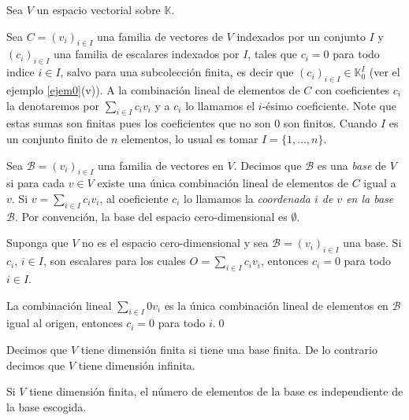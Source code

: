 Sea $V$ un espacio vectorial sobre $\mathbb{K}$. 

\begin{nota}
Sea $C=(v_i)_{i\in I}$ una familia de vectores de $V$ indexados por un conjunto $I$ y $(c_i)_{i\in I}$ una familia de escalares indexados por $I$, tales que $c_i=0$ para todo indice $i\in I$, salvo para una subcolecci\'on finita, es decir que $(c_i)_{i\in I}\in \mathbb{K}^I_0$ (ver el ejemplo \ref{ejem0}(v)). A la combinación lineal de elementos de $C$ con coeficientes $c_i$ la denotaremos por $\sum_{i\in I} c_iv_i$ y a $c_i$ lo llamamos el $i$-ésimo coeficiente. Note que estas sumas son finitas pues los coeficientes que no son $0$ son finitos. Cuando $I$ es un conjunto finito de $n$ elementos, lo usual es tomar $I=\{1,\ldots,n\}$.
\end{nota}

\begin{defn}
Sea $\mathcal{B}=(v_i)_{i\in I}$ una familia de vectores en $V$. Decimos que $\mathcal{B}$ es una \emph{base} de $V$ si para cada $v\in V$ existe una \'unica combinaci\'on lineal de elementos de $C$ igual a $v$. Si $v=\sum_{i\in I} c_iv_i$, al coeficiente $c_i$ lo llamamos la \emph{coordenada $i$ de $v$ en la base $\mathcal{B}$}. Por convenci\'on, la base del espacio cero-dimensional es $\emptyset$. 
\end{defn}

\begin{lema}\label{lemabas}
Suponga que $V$ no es el espacio cero-dimensional y sea $\mathcal{B}=(v_i)_{i\in I}$ una base. Si $c_i$, $i\in I$, son escalares para los cuales $O=\sum_{i\in I}c_iv_i$, entonces $c_i=0$ para todo $i\in I$.
\end{lema}

\dem La combinaci\'on lineal $\sum_{i\in I}0v_i$ es la \'unica combinaci\'on lineal de elementos en $\mathcal{B}$ igual al origen, entonces $c_i=0$ para todo $i$.\qed 


\begin{defn}
Decimos que $V$ tiene dimensi\'on finita si tiene una base finita. De lo contrario decimos que $V$ tiene dimensi\'on infinita.
\end{defn}

\begin{teo} \label{basedim}
Si $V$ tiene dimensi\'on finita, el n\'umero de elementos de la base es independiente de la base escogida.
\end{teo}

